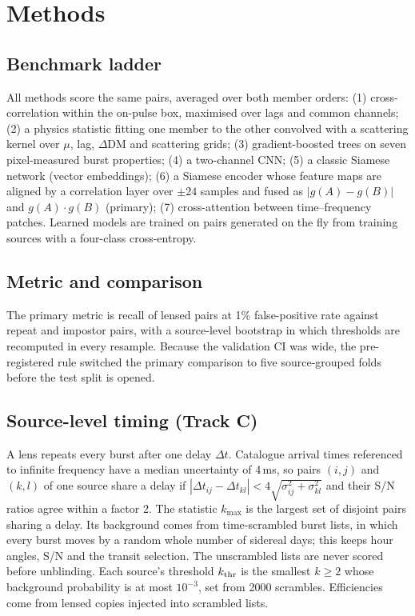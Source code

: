 \documentclass[fleqn,usenatbib]{mnras}
\begin{document}
\section{Methods}
\label{sec:methods}
\subsection{Benchmark ladder}
All methods score the same pairs, averaged over both member orders:
(1) cross-correlation within the on-pulse box, maximised over lags and common channels;
(2) a physics statistic fitting one member to the other convolved with a scattering kernel over $\mu$, lag, $\Delta$DM and
scattering grids;
(3) gradient-boosted trees on seven pixel-measured burst properties;
(4) a two-channel CNN;
(5) a classic Siamese network (vector embeddings);
(6) a Siamese encoder whose feature maps are aligned by a correlation layer over $\pm24$ samples and fused as
$|g(A)-g(B)|$ and $g(A)\cdot g(B)$ (primary);
(7) cross-attention between time--frequency patches.
Learned models are trained on pairs generated on the fly from training sources with a four-class cross-entropy.

\subsection{Metric and comparison}
The primary metric is recall of lensed pairs at 1\% false-positive rate against repeat and impostor pairs, with a
source-level bootstrap in which thresholds are recomputed in every resample. Because the validation CI was wide, the
pre-registered rule switched the primary comparison to five source-grouped folds before the test split is opened.

\subsection{Source-level timing (Track C)}
\label{sec:trackc}
A lens repeats every burst after one delay $\Delta t$. Catalogue arrival times referenced to infinite frequency have a
median uncertainty of 4\,ms, so pairs $(i,j)$ and $(k,l)$ of one source share a delay if
$|\Delta t_{ij}-\Delta t_{kl}|<4\sqrt{\sigma_{ij}^2+\sigma_{kl}^2}$ and their S/N ratios agree within a factor 2.
The statistic $k_{\max}$ is the largest set of disjoint pairs sharing a delay.
Its background comes from time-scrambled burst lists, in which every burst moves by a random whole number of sidereal days;
this keeps hour angles, S/N and the transit selection. The unscrambled lists are never scored before unblinding.
Each source's threshold $k_{\rm thr}$ is the smallest $k\ge2$ whose background probability is at most $10^{-3}$, set
from 2000 scrambles. Efficiencies come from lensed copies injected into scrambled lists.
\end{document}

